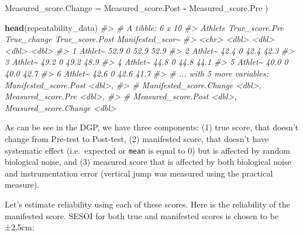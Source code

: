\documentclass[
]{book}
\newenvironment{Shaded}{\begin{snugshade}}{\end{snugshade}}
\newcommand{\CommentTok}[1]{\textcolor[rgb]{0.56,0.35,0.01}{\textit{#1}}}
\newcommand{\DataTypeTok}[1]{\textcolor[rgb]{0.13,0.29,0.53}{#1}}
\newcommand{\FloatTok}[1]{\textcolor[rgb]{0.00,0.00,0.81}{#1}}
\newcommand{\KeywordTok}[1]{\textcolor[rgb]{0.13,0.29,0.53}{\textbf{#1}}}
\newcommand{\NormalTok}[1]{#1}
\newcommand{\OperatorTok}[1]{\textcolor[rgb]{0.81,0.36,0.00}{\textbf{#1}}}
\newcommand{\StringTok}[1]{\textcolor[rgb]{0.31,0.60,0.02}{#1}}
\begin{document}
\begin{Shaded}
\begin{Highlighting}[]
  \DataTypeTok{Measured\_score.Change =}\NormalTok{ Measured\_score.Post }\OperatorTok{{-}}\StringTok{ }\NormalTok{Measured\_score.Pre}
\NormalTok{)}

\KeywordTok{head}\NormalTok{(repeatability\_data)}
\CommentTok{\#> \# A tibble: 6 x 10}
\CommentTok{\#>   Athlete True\_score.Pre True\_change True\_score.Post Manifested\_scor\textasciitilde{}}
\CommentTok{\#>   <chr>            <dbl>       <dbl>           <dbl>            <dbl>}
\CommentTok{\#> 1 Athlet\textasciitilde{}           52.9           0            52.9             52.9}
\CommentTok{\#> 2 Athlet\textasciitilde{}           42.4           0            42.4             42.3}
\CommentTok{\#> 3 Athlet\textasciitilde{}           49.2           0            49.2             48.9}
\CommentTok{\#> 4 Athlet\textasciitilde{}           44.8           0            44.8             44.1}
\CommentTok{\#> 5 Athlet\textasciitilde{}           40.0           0            40.0             42.7}
\CommentTok{\#> 6 Athlet\textasciitilde{}           42.6           0            42.6             41.7}
\CommentTok{\#> \# ... with 5 more variables: Manifested\_score.Post <dbl>,}
\CommentTok{\#> \#   Manifested\_score.Change <dbl>, Measured\_score.Pre <dbl>,}
\CommentTok{\#> \#   Measured\_score.Post <dbl>, Measured\_score.Change <dbl>}
\end{Highlighting}
\end{Shaded}

As can be see in the DGP, we have three components: (1) true score, that doesn't change from Pre-test to Post-test, (2) manifested score, that doesn't have systematic effect (i.e.~expected or \texttt{mean} is equal to 0) but is affected by random biological noise, and (3) measured score that is affected by both biological noise and instrumentation error (vertical jump was measured using the practical measure).

Let's estimate reliability using each of these scores. Here is the reliability of the manifested score. SESOI for both true and manifested scores is chosen to be ±2.5cm:

\begin{Shaded}
\end{Shaded}
\end{document}
